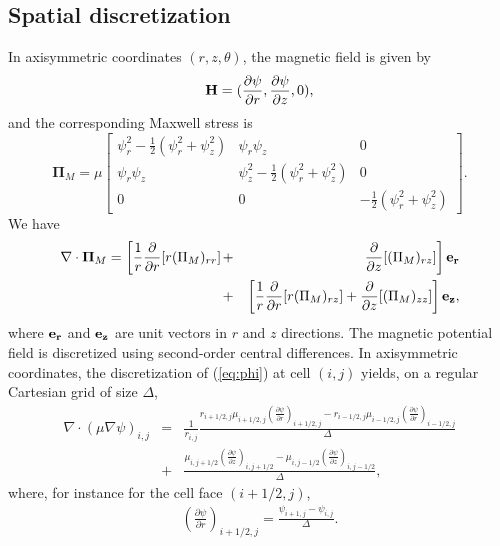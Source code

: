 \subsection{Spatial discretization}\label{ap:discrete}
In axisymmetric coordinates $(r,z,\theta)$, the magnetic field
is given by
\begin{equation}
{\bf H}=(\frac{\partial\psi}{\partial r},\frac{\partial\psi}{\partial 
z},0),
\end{equation}
and the corresponding Maxwell stress is
\begin{equation}
{\mathbf \Pi}_M = \mu \left[\begin{array}{ccc}
\psi_r^2 - \frac{1}{2}\left(\psi_r^2 
+\psi_z^2\right)
&\psi_r\psi_z& 0 \\
\psi_r\psi_z& \psi_z^2 
-
\frac{1}{2}\left(\psi_r^2 +\psi_z^2\right) & 0 \\
0 & 0 & - \frac{1}{2}\left(\psi_r^2 + \psi_z^2\right) \end{array}
                \right]. \label{magnetic tensor}
\end{equation} 
We have
\begin{eqnarray}
\nabla\cdot{\mathbf \Pi}_M = \left[\frac{1}{r}\frac{\partial}{\partial r} [r  ({\Pi}_M)_{rr}]
\right. & + & \left. \frac{\partial}{\partial z} [ ({\Pi}_M)_{rz}] \right] \bf{e_r}  \\ \nonumber
& + &\left[\frac{1}{r}\frac{\partial}{\partial r} [r ({\Pi}_M)_{rz}] + \frac{\partial}{\partial z}
[ ({\Pi}_M)_{zz}] \right] \bf{e_z},
\end{eqnarray}
where $\bf{e_r}$ and $\bf{e_z}$ are unit vectors in $r$ and $z$ directions.
The magnetic potential field is discretized using second-order central differences.
In axisymmetric coordinates,
the discretization of  (\ref{eq:phi}) at cell $(i,j)$ yields, on a regular Cartesian grid of size $\Delta$, 
\begin{eqnarray}
\nabla\cdot(\mu\nabla\psi)_{i,j} &=&
\frac{1}{r_{i,j}}\frac{r_{i+1/2,j}\mu_{i+1/2,j}(\frac{\partial\psi}{\partial
r})_{i+1/2,j}
-r_{i-1/2,j}\mu_{i-1/2,j}(\frac{\partial\psi}{\partial r})_{i-1/2,j}}{\Delta}
\nonumber\\
&+&\frac{\mu_{i,j+1/2}(\frac{\partial\psi}{\partial
z})_{i,j+1/2}-\mu_{i,j-1/2}(\frac{\partial\psi}{\partial z})_{i,j-1/2}}{\Delta},
\end{eqnarray}
where, for instance for the cell face $(i+1/2,j)$,
\begin{eqnarray}
(\frac{\partial\psi}{\partial r})_{i+1/2,j} =
\frac{\psi_{i+1,j}-\psi_{i,j}}{\Delta}.
\end{eqnarray}


